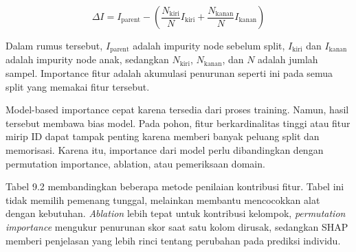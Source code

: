 \[
\Delta I = I_{\text{parent}} - \left( \dfrac{N_{\text{kiri}}}{N} I_{\text{kiri}} + \dfrac{N_{\text{kanan}}}{N} I_{\text{kanan}} \right)
\]

Dalam rumus tersebut, \(I_{\text{parent}}\) adalah impurity node sebelum split, \(I_{\text{kiri}}\) dan \(I_{\text{kanan}}\) adalah impurity node anak, sedangkan \(N_{\text{kiri}}\), \(N_{\text{kanan}}\), dan \(N\) adalah jumlah sampel. Importance fitur adalah akumulasi penurunan seperti ini pada semua split yang memakai fitur tersebut.

Model-based importance cepat karena tersedia dari proses training. Namun, hasil tersebut membawa bias model. Pada pohon, fitur berkardinalitas tinggi atau fitur mirip ID dapat tampak penting karena memberi banyak peluang split dan memorisasi. Karena itu, importance dari model perlu dibandingkan dengan permutation importance, ablation, atau pemeriksaan domain.

Tabel 9.2 membandingkan beberapa metode penilaian kontribusi fitur. Tabel ini tidak memilih pemenang tunggal, melainkan membantu mencocokkan alat dengan kebutuhan. \emph{Ablation} lebih tepat untuk kontribusi kelompok, \emph{permutation importance} mengukur penurunan skor saat satu kolom dirusak, sedangkan SHAP memberi penjelasan yang lebih rinci tentang perubahan pada prediksi individu.


